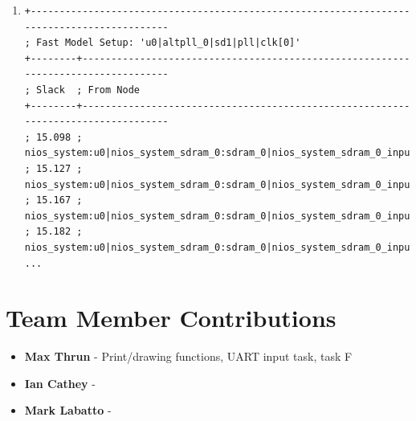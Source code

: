 \documentclass[10pt]{article}
\begin{document}
\begin{enumerate}
    \item[]
        \begin{verbatim}
+-------------------------------------------------------------------------------------------
; Fast Model Setup: 'u0|altpll_0|sd1|pll|clk[0]'                                            
+--------+----------------------------------------------------------------------------------
; Slack  ; From Node                                                                        
+--------+----------------------------------------------------------------------------------
; 15.098 ; nios_system:u0|nios_system_sdram_0:sdram_0|nios_system_sdram_0_input_efifo_module
; 15.127 ; nios_system:u0|nios_system_sdram_0:sdram_0|nios_system_sdram_0_input_efifo_module
; 15.167 ; nios_system:u0|nios_system_sdram_0:sdram_0|nios_system_sdram_0_input_efifo_module
; 15.182 ; nios_system:u0|nios_system_sdram_0:sdram_0|nios_system_sdram_0_input_efifo_module
...
        \end{verbatim}
\end{enumerate}

\section*{Team Member Contributions}
\begin{itemize}
    \item \textbf{Max Thrun} - Print/drawing functions, UART input task, task F
    \item \textbf{Ian Cathey} -
    \item \textbf{Mark Labatto} - 
\end{itemize}
\end{document}

